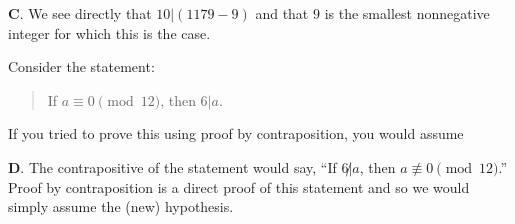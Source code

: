 \documentclass[addpoints]{exam}
\begin{document}
\begin{questions}

\begin{solution}
	\textbf{C}. We see directly that $10 | (1179 - 9)$ and that $9$ is the smallest nonnegative integer for which this is the case. 
\end{solution}


\question[2] 	Consider the statement:
	\begin{quote}
		If $a \equiv 0 \pmod {12}$, then $6 | a$. 
	\end{quote}
If you tried to prove this using proof by contraposition, you would assume

	\begin{solution}
		\textbf{D}. The contrapositive of the statement would say, ``If $6 \not | a$, then $a \not \equiv 0 \pmod {12}$.'' Proof by contraposition is a direct proof of this statement and so we would simply assume the (new) hypothesis.
	\end{solution}


\end{questions}
\end{document}
